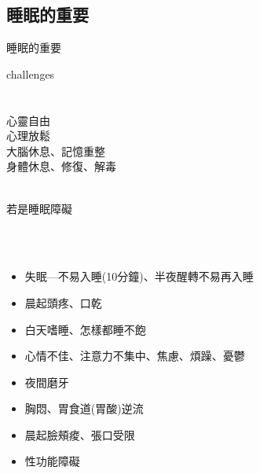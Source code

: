 \documentclass[aspectratio=169]{beamer}
\begin{document}





\subsection{睡眠的重要}
\begin{frame}{睡眠的重要}
\begin{block}{challenges}
~~~~~~~~~~~~\\
~~\\
~~\\
心靈自由\\
心理放鬆\\
大腦休息、記憶重整\\
身體休息、修復、解毒\\
~~~
\end{block}
\end{frame}

\begin{frame}{若是睡眠障礙} %
\begin{block}{}%
~~~~~~~~~~~~\\
~~\\
\begin{itemize}
\item<1-> 失眠---不易入睡(10分鐘)、半夜醒轉不易再入睡
\item<2-> 晨起頭疼、口乾
\item<3-> 白天嗜睡、怎樣都睡不飽
\item<4-> 心情不佳、注意力不集中、焦慮、煩躁、憂鬱
\item<5-> 夜間磨牙
\item<6-> 胸悶、胃食道(胃酸)逆流
\item<7-> 晨起臉頰痠、張口受限
\item<8-> 性功能障礙\\

\end{itemize}
\end{block}
\end{frame}
\end{document}
